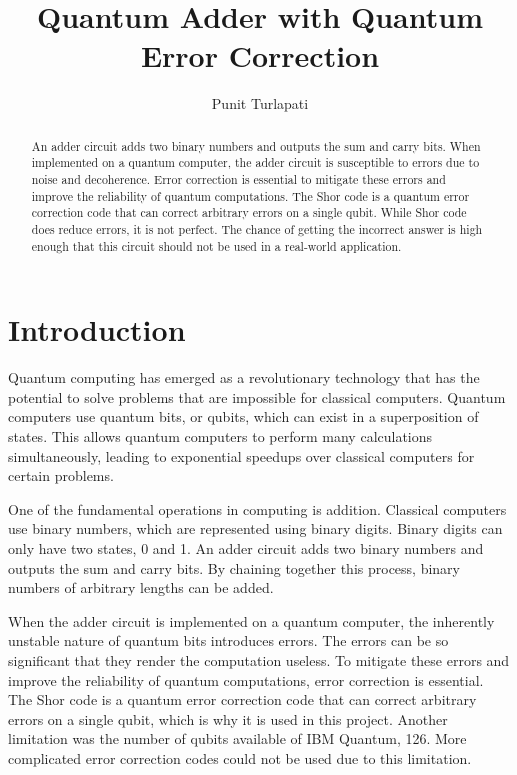 \documentclass[letterpaper]{article}
\begin{document}
\title{Quantum Adder with Quantum Error Correction}

\author{Punit Turlapati}
\maketitle

\begin{abstract}
    An adder circuit adds two binary numbers and outputs the sum and carry bits. When implemented on a quantum computer, the adder circuit is susceptible to errors due to noise and decoherence. Error correction is essential to mitigate these errors and improve the reliability of quantum computations. The Shor code is a quantum error correction code that can correct arbitrary errors on a single qubit. While Shor code does reduce errors, it is not perfect. The chance of getting the incorrect answer is high enough that this circuit should not be used in a real-world application.
\end{abstract}

\section{Introduction}

Quantum computing has emerged as a revolutionary technology that has the potential to solve problems that are impossible for classical computers. Quantum computers use quantum bits, or qubits, which can exist in a superposition of states. This allows quantum computers to perform many calculations simultaneously, leading to exponential speedups over classical computers for certain problems.

One of the fundamental operations in computing is addition. Classical computers use binary numbers, which are represented using binary digits. Binary digits can only have two states, 0 and 1. An adder circuit adds two binary numbers and outputs the sum and carry bits. By chaining together this process, binary numbers of arbitrary lengths can be added.

When the adder circuit is implemented on a quantum computer, the inherently unstable nature of quantum bits introduces errors. The errors can be so significant that they render the computation useless. To mitigate these errors and improve the reliability of quantum computations, error correction is essential. The Shor code is a quantum error correction code that can correct arbitrary errors on a single qubit, which is why it is used in this project. Another limitation was the number of qubits available of IBM Quantum, 126. More complicated error correction codes could not be used due to this limitation.
\end{document}
